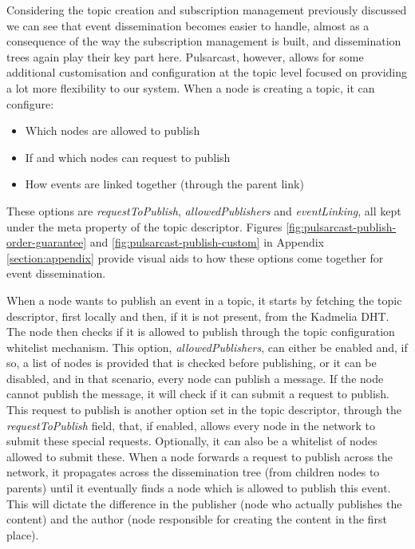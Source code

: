 Considering the topic creation and subscription management previously discussed
we can see that event dissemination becomes easier to handle, almost as a
consequence of the way the subscription management is built, and dissemination
trees again play their key part here. Pulsarcast, however, allows for some
additional customisation and configuration at the topic level focused on
providing a lot more flexibility to our system. When a node is creating a
topic, it can configure:
\begin{itemize}
  \item
    Which nodes are allowed to publish
  \item
     If and which nodes can request to publish
  \item
    How events are linked together (through the parent link)
\end{itemize}

These options are \emph{requestToPublish}, \emph{allowedPublishers} and
\emph{eventLinking}, all kept under the meta property of the topic descriptor.
Figures \ref{fig:pulsarcast-publish-order-guarantee} and
\ref{fig:pulsarcast-publish-custom} in Appendix \ref{section:appendix} provide
visual aids to how these options come together for event dissemination.

When a node wants to publish an event in a topic, it starts by fetching the
topic descriptor, first locally and then, if it is not present, from the
Kadmelia DHT. The node then checks if it is allowed to publish through the
topic configuration whitelist mechanism. This option, \emph{allowedPublishers},
can either be enabled and, if so, a list of nodes is provided that is checked
before publishing, or it can be disabled, and in that scenario, every node can
publish a message. If the node cannot publish the message, it will check if it
can submit a request to publish. This request to publish is another option set
in the topic descriptor, through the \emph{requestToPublish} field, that, if
enabled, allows every node in the network to submit these special requests.
Optionally, it can also be a whitelist of nodes allowed to submit these. When a
node forwards a request to publish across the network, it propagates across the
dissemination tree (from children nodes to parents) until it eventually finds a
node which is allowed to publish this event. This will dictate the difference
in the publisher (node who actually publishes the content) and the author (node
responsible for creating the content in the first place).


